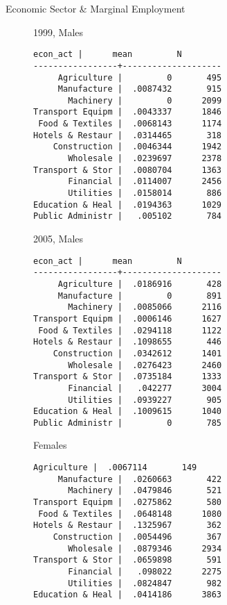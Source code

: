 \documentclass{beamer}
\begin{document}
\begin{frame}[fragile]{Economic Sector \& Marginal Employment}
\begin{figure}
\centering
\begin{minipage}[b]{0.4\textwidth}{1999, Males}
\begin{Verbatim}[fontsize=\tiny]
        econ_act |      mean         N
-----------------+--------------------
     Agriculture |         0       495
     Manufacture |  .0087432       915
       Machinery |         0      2099
Transport Equipm |  .0043337      1846
 Food & Textiles |  .0068143      1174
Hotels & Restaur |  .0314465       318
    Construction |  .0046344      1942
       Wholesale |  .0239697      2378
Transport & Stor |  .0080704      1363
       Financial |  .0114007      2456
       Utilities |  .0158014       886
Education & Heal |  .0194363      1029
Public Administr |   .005102       784
\end{Verbatim}
\end{minipage}
\begin{minipage}[b]{0.4\textwidth}{2005, Males}
\begin{Verbatim}[fontsize=\tiny]
        econ_act |      mean         N
-----------------+--------------------
     Agriculture |  .0186916       428
     Manufacture |         0       891
       Machinery |  .0085066      2116
Transport Equipm |  .0006146      1627
 Food & Textiles |  .0294118      1122
Hotels & Restaur |  .1098655       446
    Construction |  .0342612      1401
       Wholesale |  .0276423      2460
Transport & Stor |  .0735184      1333
       Financial |   .042277      3004
       Utilities |  .0939227       905
Education & Heal |  .1009615      1040
Public Administr |         0       785
\end{Verbatim}
\end{minipage}
\end{figure}
\begin{figure}
\centering
\begin{minipage}[b]{0.4\textwidth}{Females}
\begin{Verbatim}[fontsize=\tiny]
     Agriculture |  .0067114       149
     Manufacture |  .0260663       422
       Machinery |  .0479846       521
Transport Equipm |  .0275862       580
 Food & Textiles |  .0648148      1080
Hotels & Restaur |  .1325967       362
    Construction |  .0054496       367
       Wholesale |  .0879346      2934
Transport & Stor |  .0659898       591
       Financial |   .098022      2275
       Utilities |  .0824847       982
Education & Heal |  .0414186      3863

\end{Verbatim}
\end{minipage}
\end{figure}
\end{frame}
\end{document}
